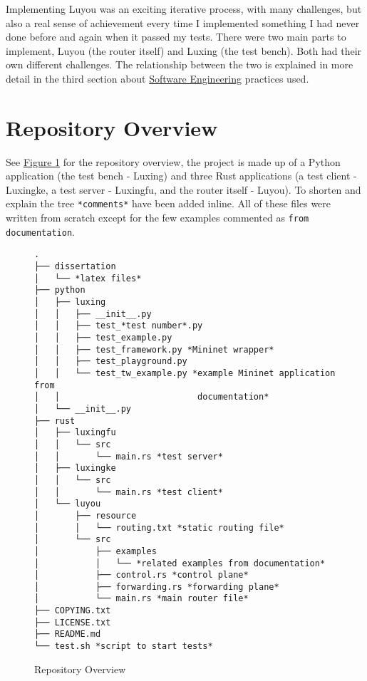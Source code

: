 \documentclass[12pt,a4paper,twoside,openright]{report}
\begin{document}
Implementing Luyou was an exciting iterative process, with many challenges, but also a real sense of achievement every time I implemented something I had never done before and again when it passed my tests.  There were two main parts to implement, Luyou (the router itself) and Luxing (the test bench).  Both had their own different challenges.  The relationship between the two is explained in more detail in the third section about \hyperref[sec::soft_eng] {Software Engineering} practices used.


\section*{Repository Overview}

See \hyperref[fig::repository_overview]{Figure }\ref{fig::repository_overview} for the repository overview, the project is made up of a Python application (the test bench - Luxing) and three Rust applications (a test client - Luxingke, a test server - Luxingfu, and the router itself - Luyou). To shorten and explain the tree \verb!*comments*! have been added inline. All of these files were written from scratch except for the few examples commented as \verb!from documentation!. 

\begin{figure}
\begin{lstlisting}[style=tree]
.
├── dissertation
│   └── *latex files*
├── python
│   ├── luxing
│   │   ├── __init__.py
│   │   ├── test_*test number*.py
│   │   ├── test_example.py
│   │   ├── test_framework.py *Mininet wrapper*
│   │   ├── test_playground.py 
│   │   └── test_tw_example.py *example Mininet application from
│   │                           documentation*
│   └── __init__.py
├── rust
│   ├── luxingfu
│   │   └── src
│   │       └── main.rs *test server*
│   ├── luxingke
│   │   └── src
│   │       └── main.rs *test client*
│   └── luyou
│       ├── resource
│       │   └── routing.txt *static routing file*
│       └── src
│           ├── examples
│           │   └── *related examples from documentation*
│           ├── control.rs *control plane*
│           ├── forwarding.rs *forwarding plane*
│           └── main.rs *main router file*
├── COPYING.txt
├── LICENSE.txt
├── README.md
└── test.sh *script to start tests*
\end{lstlisting}
\caption{Repository Overview}
\label{fig::repository_overview}
\end{figure}
\end{document}

